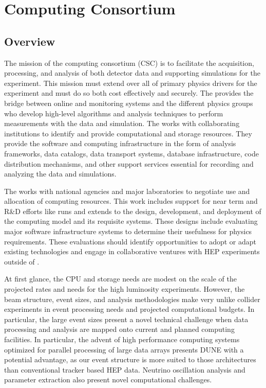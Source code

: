 \section{Computing Consortium}
\subsection{Overview}
\label{ch:exec-comp-ovr}
The mission of the  computing consortium (CSC) is to facilitate the acquisition, processing, and analysis of both detector data and supporting simulations for the  experiment.  This mission must extend over all of primary physics drivers for the experiment and must do so both cost effectively and securely. The  provides the bridge between  online  and monitoring systems and the different physics groups who develop high-level algorithms and analysis techniques to perform measurements with the  data and simulation. The  works with collaborating institutions to identify and provide computational and storage resources.  They provide the software and computing infrastructure in the form of analysis frameworks, data catalogs, data transport systems, database infrastructure, code distribution mechanisms, and other support services essential for recording and analyzing the data and simulations. 

The  works with national agencies and major laboratories to negotiate use and allocation of computing resources.  This work includes support for near term and R\&D efforts like  runs and extends to the design, development, and deployment of the  computing model and its requisite systems.
These designs include evaluating major software infrastructure systems to determine their usefulness for  physics requirements.   These evaluations should identify opportunities to adopt or adapt existing technologies and engage in collaborative ventures with HEP experiments outside of . 

At first glance,  the  CPU and storage needs are modest on the scale of the projected rates and needs for the high luminosity  experiments.  %
However, the  beam structure, event sizes, and analysis methodologies make  very unlike collider experiments in event processing needs and projected computational budgets.  In particular, the large  event sizes present a novel technical challenge when data processing and analysis are mapped onto  current and planned computing facilities. In particular, the advent of high performance computing systems optimized for parallel processing of large data arrays presents DUNE with a potential advantage, as our event structure is more suited to those architectures than conventional tracker based HEP data.
Neutrino oscillation analysis and parameter extraction also present novel computational challenges.  

